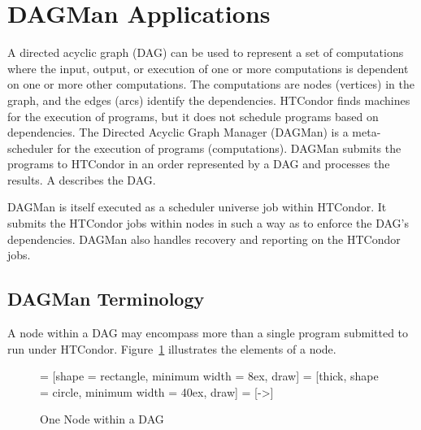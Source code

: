 \section{DAGMan Applications}\label{sec:DAGMan}

A directed acyclic graph (DAG) can be used to represent a set of computations
where the input, output, or execution of one or more computations
is dependent on one or more other computations.
The computations are nodes (vertices) in the graph,
and the edges (arcs) identify the dependencies.
HTCondor finds machines for the execution of programs, but it
does not schedule programs based on dependencies.
The Directed Acyclic Graph Manager (DAGMan) is a meta-scheduler for 
the execution of programs (computations). 
DAGMan submits the programs to HTCondor in an order represented by
a DAG and processes the results.
A  describes the DAG.

DAGMan is itself executed as a scheduler universe job
within HTCondor.
It submits the HTCondor jobs within nodes in such a way as to
enforce the DAG's dependencies.
DAGMan also handles recovery and reporting
on the HTCondor jobs.

\subsection{\label{sec:DAGTerminology}DAGMan Terminology}

A node within a DAG may encompass more than a single
program submitted to run under HTCondor.
Figure~\ref{fig:dagman-node} illustrates the elements of a node.

\begin{figure}[hbt]
\centering
{} = [shape = rectangle, minimum width = 8ex, draw]
 = [thick, shape = circle, minimum width = 40ex, draw]
 = [->]

\caption{\label{fig:dagman-node}One Node within a DAG}
\end{figure}

